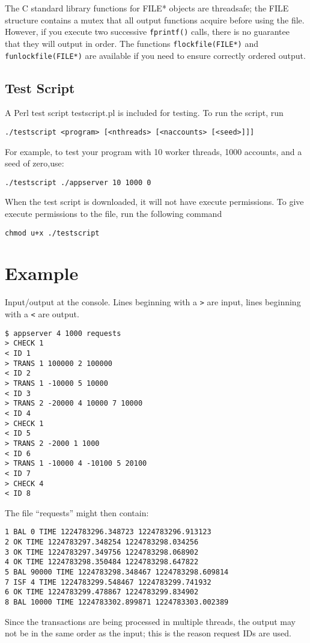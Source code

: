 \documentclass[letterpaper,10pt]{article}
\begin{document}
The C standard library functions for FILE* objects are threadsafe; the FILE structure contains a
mutex that all output functions acquire before using the file. However, if you execute two successive
\verb+fprintf()+ calls, there is no guarantee that they will output in order. The functions \verb+flockfile(FILE*)+ 
and \verb+funlockfile(FILE*)+ are available if you need to ensure correctly ordered output.

\subsection{Test Script}

A Perl test script testscript.pl is included for testing. To run the script, run
\begin{verbatim}
./testscript <program> [<nthreads> [<naccounts> [<seed>]]]
\end{verbatim}

For example, to test your program with 10 worker threads, 1000 accounts, and a seed of zero,use:
\begin{verbatim}
./testscript ./appserver 10 1000 0
\end{verbatim}

When the test script is downloaded, it will not have execute permissions. To give execute permissions
to the file, run the following command
\begin{verbatim}
chmod u+x ./testscript
\end{verbatim}

\section{Example}
Input/output at the console. Lines beginning with a \verb+>+ are input, lines beginning with a \verb+<+ are output.

\begin{verbatim}
$ appserver 4 1000 requests
> CHECK 1
< ID 1
> TRANS 1 100000 2 100000
< ID 2
> TRANS 1 -10000 5 10000
< ID 3
> TRANS 2 -20000 4 10000 7 10000
< ID 4
> CHECK 1
< ID 5
> TRANS 2 -2000 1 1000
< ID 6
> TRANS 1 -10000 4 -10100 5 20100
< ID 7
> CHECK 4
< ID 8
\end{verbatim}
The file ``requests'' might then contain:
\begin{verbatim}
1 BAL 0 TIME 1224783296.348723 1224783296.913123
2 OK TIME 1224783297.348254 1224783298.034256
3 OK TIME 1224783297.349756 1224783298.068902
4 OK TIME 1224783298.350484 1224783298.647822
5 BAL 90000 TIME 1224783298.348467 1224783298.609814
7 ISF 4 TIME 1224783299.548467 1224783299.741932
6 OK TIME 1224783299.478867 1224783299.834902
8 BAL 10000 TIME 1224783302.899871 1224783303.002389
\end{verbatim}
Since the transactions are being processed in multiple threads, the output may not be
in the same order as the input; this is the reason request IDs are used.
\end{document}
